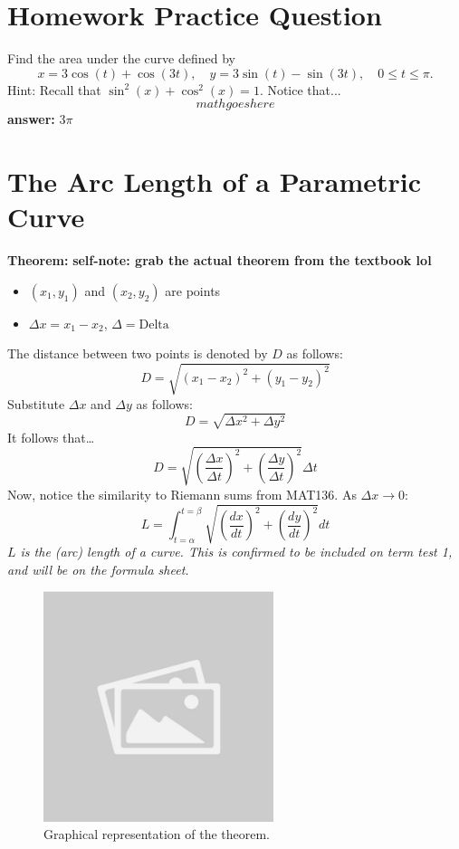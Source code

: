 \documentclass{article}
\begin{document}
\section*{Homework Practice Question}
\begin{examplebox}
    Find the area under the curve defined by
    \[
        x = 3\cos(t) + \cos(3t), \quad y = 3\sin(t) - \sin(3t), \quad 0 \leq t \leq \pi.
    \]
    Hint: Recall that \( \sin^2(x) + \cos^2(x) = 1 \).
    Notice that...
    \[
        mathgoeshere
    \]
    \textbf{answer:} \( 3\pi \) 
\end{examplebox}

\section*{The Arc Length of a Parametric Curve}
\begin{theorembox}
\textbf{Theorem:} \textbf{self-note: grab the actual theorem from the textbook lol}

\begin{itemize}
    \item \( (x_1, y_1) \) and \( (x_2, y_2) \) are points
    \item \( \Delta x = x_1 - x_2 \), \( \Delta = \text{Delta} \) 
\end{itemize}
The distance between two points is denoted by \( D \) as follows:
\[
    D = \sqrt{(x_1 - x_2)^2 + (y_1 - y_2)^2}
\]
Substitute \( \Delta x \) and \( \Delta y \) as follows:
\[
    D = \sqrt{\Delta x^2 + \Delta y^2} 
\]
It follows that\dots
\[
    D = \sqrt{(\frac{\Delta x}{\Delta t})^2 + (\frac{\Delta y}{\Delta t})^2 } \Delta t
\]
Now, notice the similarity to Riemann sums from MAT136. As \( \Delta x \to 0 \):
\[
    L = \int_{t=\alpha}^{t=\beta} \sqrt{(\frac{dx}{dt})^2 + (\frac{dy}{dt})^2} dt 
\]
\textit{\( L \) is the (arc) length of a curve. This is confirmed to be included on term test 1, and will be on the formula sheet.}

\end{theorembox}

\begin{figure}[H]
    \centering
    \includegraphics[width=0.6\textwidth]{sample_image1.jpg}
    \caption{Graphical representation of the theorem.}
    \label{fig:sample_image1}
\end{figure}
\end{document}
